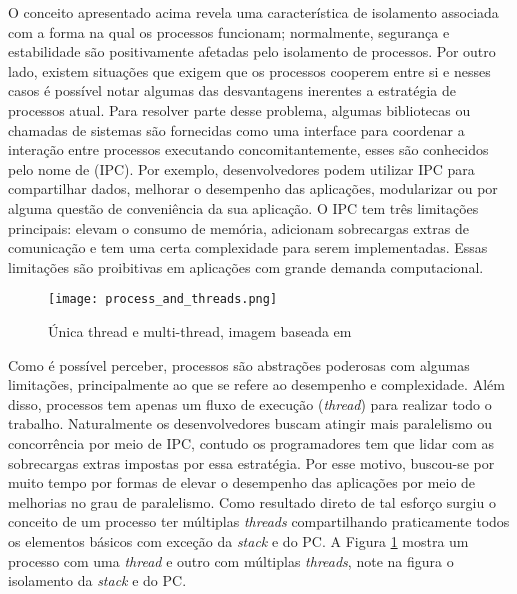 O conceito apresentado acima revela uma característica de isolamento associada
com a forma na qual os processos funcionam; normalmente, segurança e
estabilidade são positivamente afetadas pelo isolamento de processos. Por outro
lado, existem situações que exigem que os processos cooperem entre si e nesses
casos é possível notar algumas das desvantagens inerentes a estratégia de
processos atual. Para resolver parte desse problema, algumas bibliotecas ou
chamadas de sistemas são fornecidas como uma interface para coordenar a
interação entre processos executando concomitantemente, esses são conhecidos
pelo nome de  (IPC). Por exemplo,
desenvolvedores podem utilizar IPC para compartilhar dados, melhorar o
desempenho das aplicações, modularizar ou por alguma questão de conveniência
da sua aplicação. O IPC tem três limitações principais: elevam o consumo de
memória, adicionam sobrecargas extras de comunicação e tem uma certa
complexidade para serem implementadas. Essas limitações são proibitivas em
aplicações com grande demanda computacional.

\begin{figure}[!h]
  \centering
  \texttt{[image: process\_and\_threads.png]}
  \caption{Única thread e multi-thread, imagem baseada em \cite{silberschatz}}
  \label{fig:single_thread_multi_thread}
\end{figure}

Como é possível perceber, processos são abstrações poderosas com algumas
limitações, principalmente ao que se refere ao desempenho e complexidade. Além
disso, processos tem apenas um fluxo de execução (\textit{thread}) para
realizar todo o trabalho. Naturalmente os desenvolvedores buscam atingir mais
paralelismo ou concorrência por meio de IPC, contudo os programadores tem que
lidar com as sobrecargas extras impostas por essa estratégia. Por esse motivo,
buscou-se por muito tempo por formas de elevar o desempenho das aplicações por
meio de melhorias no grau de paralelismo. Como resultado direto de tal esforço
surgiu o conceito de um processo ter múltiplas \emph{threads} compartilhando
praticamente todos os elementos básicos com exceção da \emph{stack} e do PC. A
Figura \ref{fig:single_thread_multi_thread} mostra um processo com uma
\emph{thread} e outro com múltiplas \emph{threads}, note na figura o isolamento
da \emph{stack} e do PC.




